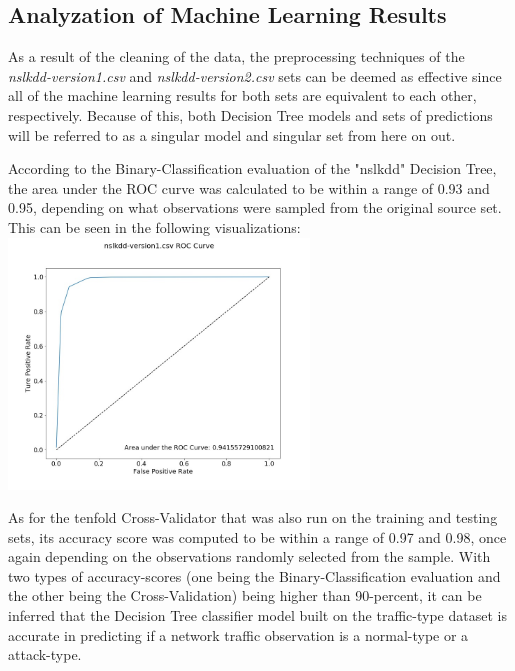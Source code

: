 \documentclass[a4paper,12pt]{IEEEtran}
\begin{document}
\subsection{Analyzation of Machine Learning Results}
As a result of the cleaning of the data, the preprocessing techniques of the \textit{nslkdd-version1.csv} and \textit{nslkdd-version2.csv} sets can be deemed as effective since all of the machine learning results for both sets are equivalent to each other, respectively. Because of this, both Decision Tree models and sets of predictions will be referred to as a singular model and singular set from here on out.

According to the Binary-Classification evaluation of the "nslkdd" Decision Tree, the area under the ROC curve was calculated to be within a range of 0.93 and 0.95, depending on what observations were sampled from the original source set. This can be seen in the following visualizations:
\includegraphics[width=8cm]{v1_roc}

As for the tenfold Cross-Validator that was also run on the training and testing sets, its accuracy score was computed to be within a range of 0.97 and 0.98, once again depending on the observations randomly selected from the sample. With two types of accuracy-scores (one being the Binary-Classification evaluation and the other being the Cross-Validation) being higher than 90-percent, it can be inferred that the Decision Tree classifier model built on the traffic-type dataset is accurate in predicting if a network traffic observation is a normal-type or a attack-type.
\end{document}
